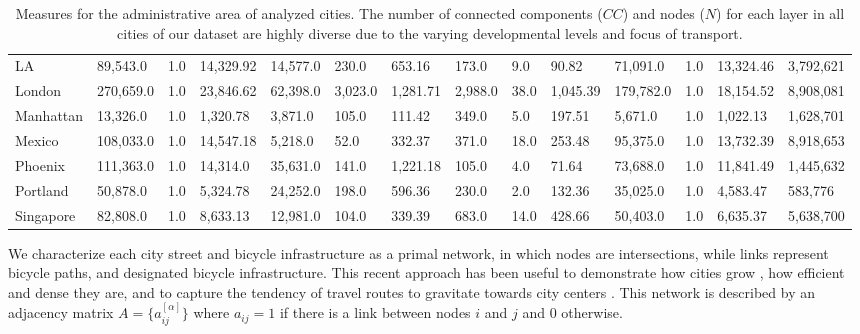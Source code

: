 \begin{table}[th!]
\begin{adjustbox}{width=\textwidth,keepaspectratio}
\begin{tabular}{llllllllllllll}
      LA         & 89,543.0                 & 1.0                      & 14,329.92                & 14,577.0                  & 230.0      & 653.16     & 173.0   & 9.0  & 90.82      & 71,091.0  & 1.0  & 13,324.46                      & 3,792,621  \\
      London     & 270,659.0                & 1.0                      & 23,846.62                & 62,398.0                  & 3,023.0    & 1,281.71   & 2,988.0 & 38.0 & 1,045.39   & 179,782.0 & 1.0  & 18,154.52                      & 8,908,081  \\
      Manhattan  & 13,326.0                 & 1.0                      & 1,320.78                 & 3,871.0                   & 105.0      & 111.42     & 349.0   & 5.0  & 197.51     & 5,671.0   & 1.0  & 1,022.13                       & 1,628,701  \\
      Mexico     & 108,033.0                & 1.0                      & 14,547.18                & 5,218.0                   & 52.0       & 332.37     & 371.0   & 18.0 & 253.48     & 95,375.0  & 1.0  & 13,732.39                      & 8,918,653  \\
      Phoenix    & 111,363.0                & 1.0                      & 14,314.0                 & 35,631.0                  & 141.0      & 1,221.18   & 105.0   & 4.0  & 71.64      & 73,688.0  & 1.0  & 11,841.49                      & 1,445,632  \\
      Portland   & 50,878.0                 & 1.0                      & 5,324.78                 & 24,252.0                  & 198.0      & 596.36     & 230.0   & 2.0  & 132.36     & 35,025.0  & 1.0  & 4,583.47                       & 583,776    \\
      Singapore  & 82,808.0                 & 1.0                      & 8,633.13                 & 12,981.0                  & 104.0      & 339.39     & 683.0   & 14.0 & 428.66     & 50,403.0  & 1.0  & 6,635.37                       & 5,638,700  \\
      \bottomrule
    \end{tabular}
  \end{adjustbox}
  \caption[Measures for analyzed cities]{Measures for the administrative area of analyzed cities. The number of connected components ($CC$) and nodes ($N$) for each layer in all cities of our dataset are highly diverse due to the varying developmental levels and focus of transport.
    \label{tab:DataDrivenCities}}
\end{table}

We characterize each city street and bicycle infrastructure as a primal network, \cite{Porta2006Primal} in which nodes are intersections, while links represent bicycle paths, and designated bicycle infrastructure. This recent approach has been useful to demonstrate how cities grow \cite{Strano2012Evolution,Barthelemy2013Evolution}, how efficient \cite{Gallotti2014Efficiency} and dense they are, and to capture the tendency of travel routes to gravitate towards city centers \cite{Lee2017Morphology}. This network is described by an adjacency matrix $A=\{a_{ij}^{[\alpha]}\}$ where $a_{ij}=1$ if there is a link between nodes $i$ and $j$ and 0 otherwise.

